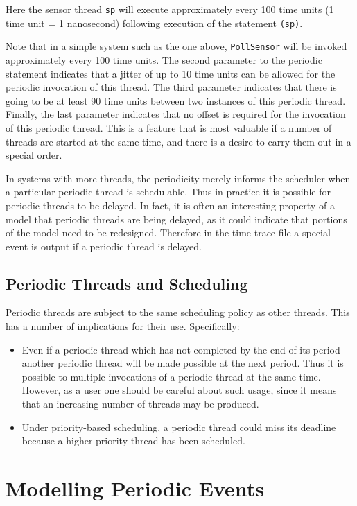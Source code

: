 \documentclass{overturerepchap}
\begin{document}
Here the sensor thread \texttt{sp} will execute approximately 
every 100 time units (1 time unit = 1 nanosecond)
following execution of the statement {\bf{}}\texttt{(sp)}.

Note that in a simple system such as the one above,
\texttt{PollSensor} will be invoked approximately every 100 time
units. The second parameter to the periodic statement indicates that a
jitter of up to 10 time units can be allowed for the periodic invocation of this
thread. The third parameter indicates that there is going to be at
least 90 time units between two instances of this periodic
thread. Finally, the last parameter indicates that no offset is
required for the invocation of this periodic thread. This is a feature
that is most valuable if a number of threads are started at the same
time, and there is a desire to carry them out in a special order.

In systems with more threads, the periodicity merely
informs the scheduler when a particular periodic thread is
schedulable. Thus in practice it is possible for periodic threads to
be delayed. In fact, it is often an interesting property of a model
that periodic threads are being delayed, as it could indicate that
portions of the model need to be redesigned. Therefore in the time
trace file a special event is output if a periodic thread is delayed.

\subsection{Periodic Threads and Scheduling}

Periodic threads are subject to the same scheduling policy as other
threads. This has a number of implications for their
use. Specifically:

\begin{itemize}
\item Even if a periodic thread which has not
completed by the end of its period another periodic thread will be
made possible at the next period. Thus it is possible to multiple
invocations of a periodic thread at the same time. However, as a user
one should be careful about such usage, since it means that an
increasing number of threads may be produced.
\item Under priority-based scheduling, a periodic thread could miss
its deadline because a higher priority thread has been scheduled.
\end{itemize}

\section{Modelling Periodic Events}\label{sec:modperevents}
\end{document}

